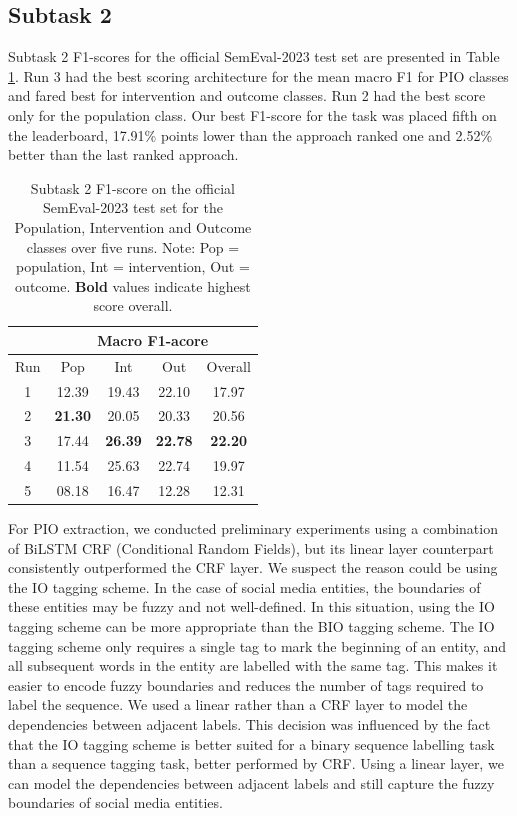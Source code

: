 \documentclass[11pt]{article}
\begin{document}
\subsection{Subtask 2}
\label{res:task2}
%
Subtask 2 F1-scores for the official SemEval-2023 test set are presented in Table \ref{tab:task_2}.
Run 3 had the best scoring architecture for the mean macro F1 for PIO classes and fared best for intervention and outcome classes.
Run 2 had the best score only for the population class.
Our best F1-score for the task was placed fifth on the leaderboard, 17.91\% points lower than the approach ranked one and 2.52\% better than the last ranked approach.
%
\begin{table}[ht]
    \centering
    \begin{tabular}{ccccc}
        \toprule
          & \multicolumn{4}{c}{Macro F1-acore} \\
         \hline
        Run & Pop & Int & Out & Overall \\
        \midrule
        1 & 12.39 & 19.43 & 22.10 & 17.97 \\
        2 & \textbf{21.30} & 20.05 & 20.33 & 20.56  \\
        3 & 17.44 & \textbf{26.39} & \textbf{22.78} & \textbf{22.20} \\
        4 & 11.54 & 25.63 & 22.74 & 19.97 \\
        5 & 08.18 & 16.47 & 12.28 & 12.31 \\
        \bottomrule
    \end{tabular}
    \caption{Subtask 2 F1-score on the official SemEval-2023 test set for the Population, Intervention and Outcome classes over five runs. Note: Pop = population, Int = intervention, Out = outcome. \textbf{Bold} values indicate highest score overall.}
    \label{tab:task_2}
\end{table}
%
For PIO extraction, we conducted preliminary experiments using a combination of BiLSTM CRF (Conditional Random Fields), but its linear layer counterpart consistently outperformed the CRF layer.
We suspect the reason could be using the IO tagging scheme.
In the case of social media entities, the boundaries of these entities may be fuzzy and not well-defined.
In this situation, using the IO tagging scheme can be more appropriate than the BIO tagging scheme.
The IO tagging scheme only requires a single tag to mark the beginning of an entity, and all subsequent words in the entity are labelled with the same tag.
This makes it easier to encode fuzzy boundaries and reduces the number of tags required to label the sequence.
We used a linear rather than a CRF layer to model the dependencies between adjacent labels.
This decision was influenced by the fact that the IO tagging scheme is better suited for a binary sequence labelling task than a sequence tagging task, better performed by CRF.
Using a linear layer, we can model the dependencies between adjacent labels and still capture the fuzzy boundaries of social media entities.
%
%
%
\end{document}
